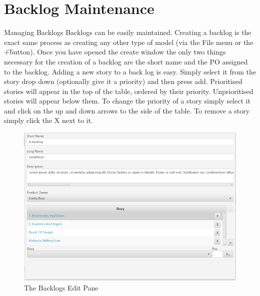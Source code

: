 \section{Backlog Maintenance}

Managing Backlogs
\newline\newline
Backlogs can be easily maintained. Creating a backlog is the exact same process as creating any other type of model (via the File menu or the \'+\' button). Once you have opened the create window the only two things necessary for the creation of a backlog are the short name and the PO assigned to the backlog.
\newline
Adding a new story to a back log is easy. Simply select it from the story drop down (optionally give it a priority) and then press add. Prioritised stories will appear in the top of the table, ordered by their priority. Unprioritised stories will appear below them. To change the priority of a story simply select it and click on the up and down arrows to the side of the table. To remove a story simply click the X next to it.

\begin{figure}[H]
\centering
\includegraphics[width=\textwidth]{images/screenshots/backlogs.PNG}
\caption{The Backlogs Edit Pane}
\label{fig:new_project}
\end{figure}